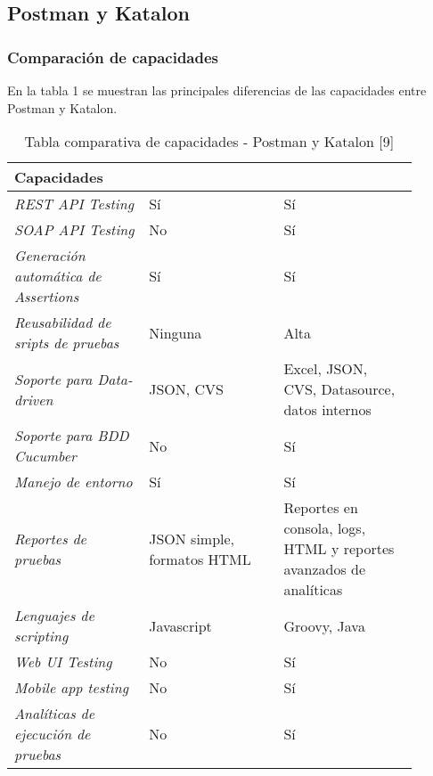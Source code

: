 \documentclass[twoside,twocolumn]{article}
\begin{document}
\subsection{Postman y Katalon}

\subsubsection{Comparación de capacidades}

En la tabla 1 se muestran las principales diferencias de las capacidades entre Postman y Katalon.

\begin{table*}[]
\begin{tabular}{p{0.3\linewidth} | p{0.3\linewidth} | p{0.3\linewidth}}
\toprule
\textbf{Capacidades}              & \cellcolor[HTML]{FFFFFF}{\color[HTML]{FF6D2A} \textbf{Postman}} & \cellcolor[HTML]{FFFFFF}{\color[HTML]{0EA4DD} \textbf{Katalon}}    \\ \midrule
\textit{REST API Testing}                    & Sí         & Sí           \\
\textit{SOAP API Testing}                    & No         & Sí           \\
\textit{Generación automática de Assertions} & Sí         & Sí           \\
\textit{Reusabilidad de sripts de pruebas}   & Ninguna    & Alta         \\
\textit{Soporte para Data-driven} & JSON, CVS                                                       & Excel, JSON, CVS, Datasource, datos internos                       \\
\textit{Soporte para BDD Cucumber}           & No         & Sí           \\
\textit{Manejo de entorno}                   & Sí         & Sí           \\
\textit{Reportes de pruebas}      & JSON simple, formatos HTML                                      & Reportes en consola, logs, HTML y reportes avanzados de analíticas \\
\textit{Lenguajes de scripting}              & Javascript & Groovy, Java \\
\textit{Web UI Testing}                      & No         & Sí           \\
\textit{Mobile app testing}                  & No         & Sí           \\
\textit{Analíticas de ejecución de pruebas}  & No         & Sí           \\ \bottomrule
\end{tabular}
\caption{Tabla comparativa de capacidades - Postman y Katalon [9]}
\label{tabla1}
\end{table*}
\end{document}
